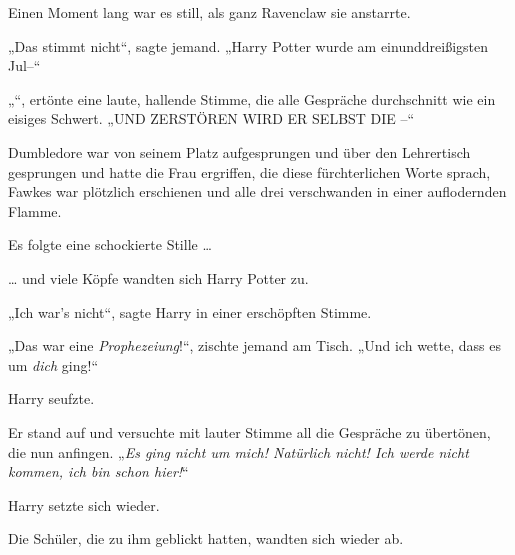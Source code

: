 Einen Moment lang war es still, als ganz Ravenclaw sie anstarrte.

„Das stimmt nicht“, sagte jemand. „Harry Potter wurde am einunddreißigsten Jul–“

„“, ertönte eine laute, hallende Stimme, die alle Gespräche durchschnitt wie ein eisiges Schwert. „UND ZERSTÖREN WIRD ER SELBST DIE –“

Dumbledore war von seinem Platz aufgesprungen und über den Lehrertisch gesprungen und hatte die Frau ergriffen, die diese fürchterlichen Worte sprach, Fawkes war plötzlich erschienen und alle drei verschwanden in einer auflodernden Flamme.

Es folgte eine schockierte Stille …

… und viele Köpfe wandten sich Harry Potter zu.

„Ich war’s nicht“, sagte Harry in einer erschöpften Stimme.

„Das war eine \emph{Prophezeiung}!“, zischte jemand am Tisch. „Und ich wette, dass es um \emph{dich} ging!“

Harry seufzte.

Er stand auf und versuchte mit lauter Stimme all die Gespräche zu übertönen, die nun anfingen. „\emph{Es ging nicht um mich! Natürlich nicht! Ich werde nicht kommen, ich bin schon hier!}“

Harry setzte sich wieder.

Die Schüler, die zu ihm geblickt hatten, wandten sich wieder ab.

